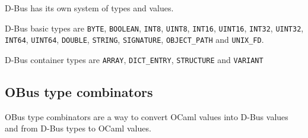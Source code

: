\documentclass{article}
\begin{document}
D-Bus has its own system of types and values.

D-Bus basic types are \texttt{BYTE}, \texttt{BOOLEAN}, \texttt{INT8},
\texttt{UINT8}, \texttt{INT16}, \texttt{UINT16}, \texttt{INT32},
\texttt{UINT32}, \texttt{INT64}, \texttt{UINT64}, \texttt{DOUBLE},
\texttt{STRING}, \texttt{SIGNATURE}, \texttt{OBJECT\_PATH} and
\texttt{UNIX\_FD}.

D-Bus container types are \texttt{ARRAY}, \texttt{DICT\_ENTRY},
\texttt{STRUCTURE} and \texttt{VARIANT}

\subsection{OBus type combinators}

OBus type combinators are a way to convert OCaml values into D-Bus
values and from D-Bus types to OCaml values.

\end{document}
